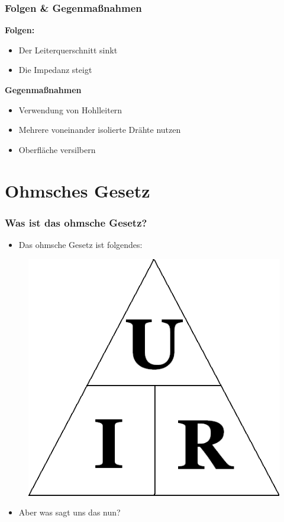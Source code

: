 \begin{frame}
  \frametitle{Folgen \& Gegenmaßnahmen}
  \textbf{Folgen:}
  \begin{itemize}
    \item Der Leiterquerschnitt sinkt
    \item Die Impedanz steigt
  \end{itemize}
  \textbf{Gegenmaßnahmen}
  \begin{itemize}
    \item Verwendung von Hohlleitern
    \item Mehrere voneinander isolierte Drähte nutzen
    \item Oberfläche versilbern
  \end{itemize}
\end{frame}

\section{Ohmsches Gesetz}

\begin{frame}
  \frametitle{Was ist das ohmsche Gesetz?}
  \begin{itemize}
    \item Das ohmsche Gesetz ist folgendes:
  \end{itemize}
  \begin{center}
    \begin{figure}
      \includegraphics[width=.5\textwidth,height=.5\textheight,keepaspectratio]{e03/Ohm_law_triangle.png}
    \end{figure}
  \end{center}
  \begin{itemize}
    \item Aber was sagt uns das nun?
  \end{itemize}
\end{frame}

